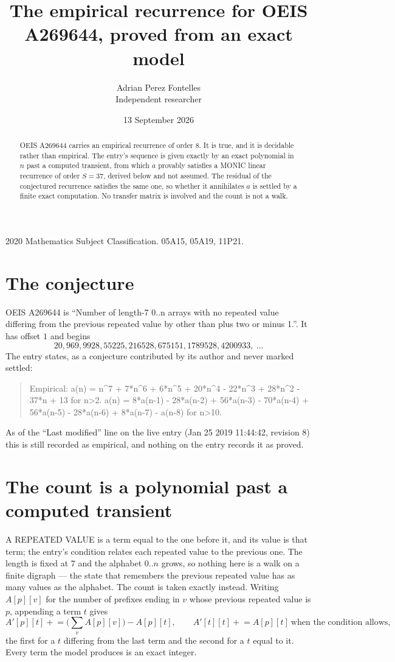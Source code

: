 \documentclass[11pt,a4paper]{article}
\title{The empirical recurrence for OEIS A269644, proved from an exact model}
\author{Adrian Perez Fontelles\\ \small Independent researcher}
\date{13 September 2026}
\theoremstyle{plain}
\theoremstyle{definition}
\begin{document}
\maketitle

\begin{abstract}
OEIS A269644 carries an empirical recurrence of order $8$. It is true, and it is
decidable rather than empirical. The entry's sequence is given exactly by an exact polynomial in $n$ past a computed transient, from
which $a$ provably satisfies a MONIC linear recurrence of order $S=37$, derived below and not
assumed. The residual of the conjectured recurrence satisfies the same one, so whether it
annihilates $a$ is settled by a finite exact computation. No transfer matrix is involved and
the count is not a walk.
\end{abstract}

\noindent\small 2020 Mathematics Subject Classification. 05A15, 05A19, 11P21.\normalsize

\section{The conjecture}

OEIS A269644 is ``Number of length-7 0..n arrays with no repeated value differing from the previous repeated value by other than plus two or minus 1.''. It has offset $1$ and begins
\[
20, 969, 9928, 55225, 216528, 675151, 1789528, 4200933,\ \dots
\]
The entry states, as a conjecture contributed by its author and never marked settled:
\begin{quote}
Empirical: a(n) = n\^{}7 + 7*n\^{}6 + 6*n\^{}5 + 20*n\^{}4 - 22*n\^{}3 + 28*n\^{}2 - 37*n + 13 for n>2. a(n) = 8*a(n-1) - 28*a(n-2) + 56*a(n-3) - 70*a(n-4) + 56*a(n-5) - 28*a(n-6) + 8*a(n-7) - a(n-8) for n>10.
\end{quote}
As of the ``Last modified'' line on the live entry (Jan 25 2019 11:44:42, revision 8)
this is still recorded as empirical, and nothing on the entry records it as proved.

\section{The count is a polynomial past a computed transient}

A REPEATED VALUE is a term equal to the one before it, and its value is that term; the entry's
condition relates each repeated value to the previous one. The length is fixed at $7$ and the
alphabet $0..n$ grows, so nothing here is a walk on a finite digraph --- the state that
remembers the previous repeated value has as many values as the alphabet. The count is taken
exactly instead. Writing $A[p][v]$ for the number of prefixes ending in $v$ whose previous
repeated value is $p$, appending a term $t$ gives
\[
A'[p][t] \mathrel{+}= \Big(\sum_v A[p][v]\Big) - A[p][t],
\qquad
A'[t][t] \mathrel{+}= A[p][t]\ \text{when the condition allows},
\]
the first for a $t$ differing from the last term and the second for a $t$ equal to it. Every
term the model produces is an exact integer.
\end{document}
